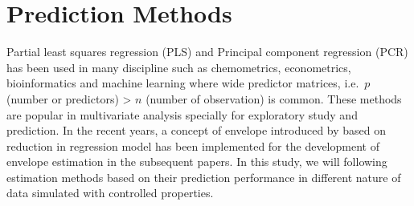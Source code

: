 \documentclass[12pt,3p,authoryear]{elsarticle}
\begin{document}
\hypertarget{prediction-methods}{%
\section{Prediction Methods}\label{prediction-methods}}

Partial least squares regression (PLS) and Principal component
regression (PCR) has been used in many discipline such as chemometrics,
econometrics, bioinformatics and machine learning where wide predictor
matrices, i.e.~\(p\) (number or predictors) \textgreater{} \(n\) (number
of observation) is common. These methods are popular in multivariate
analysis specially for exploratory study and prediction. In the recent
years, a concept of envelope introduced by \citet{Cook2007a} based on
reduction in regression model has been implemented for the development
of envelope estimation in the subsequent papers. In this study, we will
following estimation methods based on their prediction performance in
different nature of data simulated with controlled properties.
\end{document}
